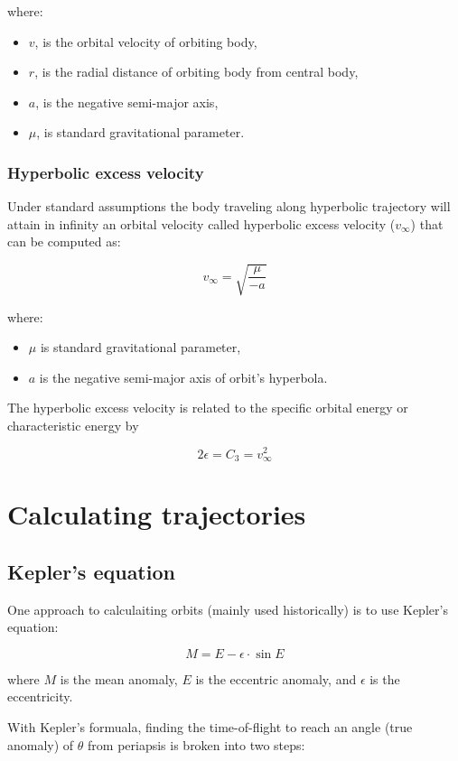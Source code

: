 \documentclass[12pt]{article}
\begin{document}
where:

\begin{itemize}
  \item \(v\), is the orbital velocity of orbiting body,
  \item \(r\), is the radial distance of orbiting body from central body,
  \item \(a\), is the negative semi-major axis,
  \item \(\mu\), is standard gravitational parameter.
\end{itemize}

\subsubsection{Hyperbolic excess velocity}

Under standard assumptions the body traveling along hyperbolic trajectory will attain in infinity an orbital velocity called hyperbolic excess velocity (\(v_\infty\)) that can be computed as:

\[v_\infty=\sqrt{\frac{\mu}{-a}}\]

where:

\begin{itemize}
  \item \(\mu\) is standard gravitational parameter,
  \item \(a\) is the negative semi-major axis of orbit's hyperbola.
\end{itemize}

The hyperbolic excess velocity is related to the specific orbital energy or characteristic energy by

\[2\epsilon=C_3=v_{\infty}^2\]

\section{Calculating trajectories}

\subsection{Kepler's equation}

One approach to calculaiting orbits (mainly used historically) is to use Kepler's equation:

\[M=E-\epsilon\cdot\sin E\]

where \(M\) is the mean anomaly, \(E\) is the eccentric anomaly, and \(\epsilon\) is the eccentricity.

With Kepler's formuala, finding the time-of-flight to reach an angle (true anomaly) of \(\theta\) from periapsis is broken into two steps:
\end{document}
